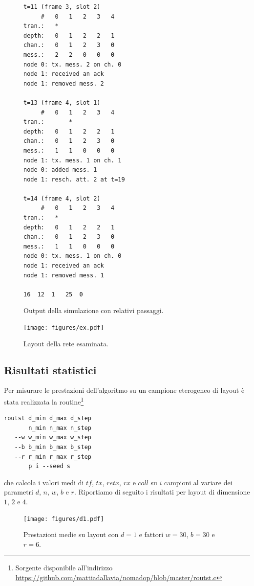 \documentclass[a4paper,12pt]{article}
\theoremstyle{definition}
\begin{document}
\begin{figure}[H]
\begin{multicols}{3}
\begin{Verbatim}[fontsize=\scriptsize,tabsize=2]
t=11 (frame 3, slot 2)
     #   0   1   2   3   4 
tran.:   *                 
depth:   0   1   2   2   1 
chan.:   0   1   2   3   0 
mess.:   2   2   0   0   0 
node 0: tx. mess. 2 on ch. 0
node 1: received an ack
node 1: removed mess. 2

t=13 (frame 4, slot 1)
     #   0   1   2   3   4 
tran.:       *             
depth:   0   1   2   2   1 
chan.:   0   1   2   3   0 
mess.:   1   1   0   0   0 
node 1: tx. mess. 1 on ch. 1
node 0: added mess. 1
node 1: resch. att. 2 at t=19

t=14 (frame 4, slot 2)
     #   0   1   2   3   4 
tran.:   *                 
depth:   0   1   2   2   1 
chan.:   0   1   2   3   0 
mess.:   1   1   0   0   0 
node 0: tx. mess. 1 on ch. 0
node 1: received an ack
node 1: removed mess. 1

16	12	1	25	0
\end{Verbatim}
\end{multicols}
\caption{Output della simulazione con relativi passaggi.}
\end{figure}


\begin{figure}[H]
\centering
\texttt{[image: figures/ex.pdf]}
\caption{Layout della rete esaminata.}
\end{figure}

\subsection{Risultati statistici}

Per misurare le prestazioni dell'algoritmo su un campione eterogeneo di layout è stata realizzata la routine\footnote{Sorgente disponibile all'indirizzo \url{https://github.com/mattiadallavia/nomadop/blob/master/routst.c}}

{\centering
\begin{BVerbatim}
routst d_min d_max d_step
       n_min n_max n_step
   --w w_min w_max w_step
   --b b_min b_max b_step
   --r r_min r_max r_step
       p i --seed s
\end{BVerbatim}

}

che calcola i valori medi di $tf$, $tx$, $retx$, $rx$ e $coll$ su $i$ campioni al variare dei parametri $d$, $n$, $w$, $b$ e $r$. Riportiamo di seguito i risultati per layout di dimensione $1$, $2$ e $4$.

\begin{figure}[H]
\centering
\texttt{[image: figures/d1.pdf]}
\caption{Prestazioni medie su layout con $d=1$ e fattori $w=30$, $b=30$ e $r=6$.}
\end{figure}
\end{document}
